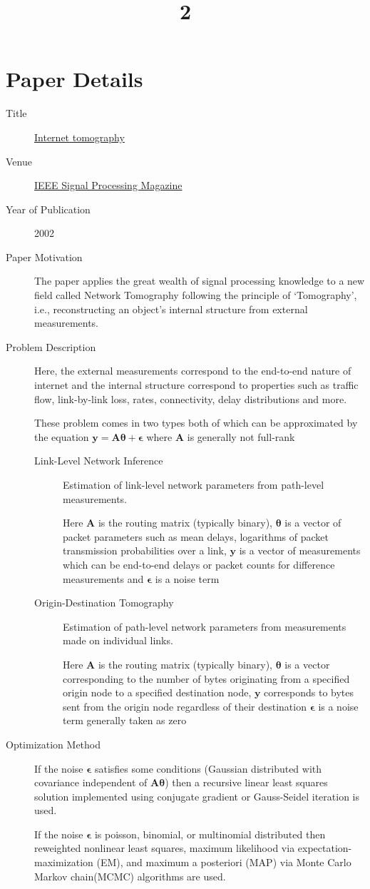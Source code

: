 \documentclass[a4paper]{article}
\title{2}
\date{}
\begin{document}
\maketitle
\section{Paper Details}
\begin{description}
	\item[Title] \href{https://ieeexplore.ieee.org/document/998081}{Internet tomography}
	\item[Venue] \href{https://ieeexplore.ieee.org/xpl/RecentIssue.jsp?punumber=79}{IEEE Signal Processing Magazine}
	\item[Year of Publication] 2002
	\item[Paper Motivation] The paper applies the great wealth of signal processing knowledge to a new field called Network Tomography following the principle of `Tomography', i.e., reconstructing an object's internal structure from external measurements. 
	\item[Problem Description] Here, the external measurements correspond to the end-to-end nature of internet and the internal structure correspond to properties such as traffic flow, link-by-link loss, rates, connectivity, delay distributions and more.

	These problem comes in two types both of which can be approximated by the equation $\bm{y}=\bm{A}\bm{\theta}+\bm{\epsilon}$ where $\bm{A}$ is generally not full-rank
	\begin{description}
	\item[Link-Level Network Inference] Estimation of link-level network parameters from path-level measurements.

	Here $\bm{A}$ is the routing matrix (typically binary), $\bm{\theta}$ is a vector of packet parameters such as mean delays, logarithms of
packet transmission probabilities over a link, $\bm{y}$ is a vector of measurements which can be end-to-end delays or packet counts for difference measurements and $\bm{\epsilon}$ is a noise term
	\item[Origin-Destination Tomography] Estimation of path-level network parameters from measurements made on individual links. 

	Here $\bm{A}$ is the routing matrix (typically binary), $\bm{\theta}$ is a vector corresponding to the number of bytes originating from a specified origin node to a specified destination node, $\bm{y}$ corresponds to bytes sent from the origin node regardless of their destination $\bm{\epsilon}$ is a noise term generally taken as zero
	\end{description}
	\item[Optimization Method] If the noise $\bm{\epsilon}$ satisfies some conditions (Gaussian distributed with covariance independent of $\bm{A\theta}$) then a recursive linear least squares solution implemented using conjugate gradient or Gauss-Seidel iteration is used.

	If the noise $\bm{\epsilon}$ is poisson, binomial, or multinomial distributed then reweighted nonlinear least squares, maximum likelihood via expectation-maximization (EM), and maximum a posteriori (MAP) via Monte Carlo Markov chain(MCMC) algorithms are used.
\end{description}
\end{document}
